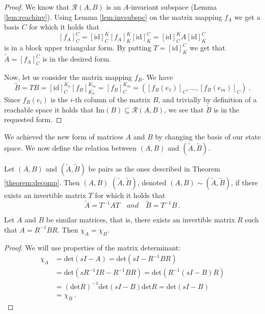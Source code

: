 \begin{proof}
	We know that $\mathcal{R}(A,B)$ is an $A$-invariant subspace (Lemma \ref{lem:reachinv}). Using Lemma \ref{lem:invsubspc} on the matrix mapping $f_A$ we get a basis $C$ for which it holds that 
	$$[f_A]^C_C=[\text{id}]^K_C[f_A]^K_K[\text{id}]^C_K=[\text{id}]^K_CA[\text{id}]^C_K$$ 
	is in a block upper triangular form. By putting $T=[\text{id}]^C_K$ we get that $\widetilde{A}=[f_A]^C_C$ is in the desired form.

	Now, let us consider the matrix mapping $f_B$. We have
	$$\widetilde{B}=TB=[\text{id}]^{K_n}_C[f_B]^{K_m}_{K_n}=[f_B]^{K_m}_C=([f_B(e_1)]_C,\ldots,[f_B(e_m)]_C)\ .$$
	Since $f_B(e_i)$ is the $i$-th column of the matrix $B$, and trivially by definition of a reachable space it holds that $\text{Im}(B)\subseteq \mathcal{R}(A,B)$, we see that $\widetilde{B}$ is in the requested form.
\end{proof}

We achieved the new form of matrices $A$ and $B$ by changing the basis of our state space. We now define the relation between $(A,B)$ and $(\widetilde{A},\widetilde{B}).$

\begin{definition}
	Let $(A,B)$ and $(\widetilde{A},\widetilde{B})$ be pairs as the ones described in Theorem \ref{theorem:decomp}. Then $(A,B)$  $(\widetilde{A},\widetilde{B})$, denoted $(A,B) \sim (\widetilde{A},\widetilde{B})$, if there exists an invertible matrix $T$ for which it holds that
	$$\widetilde{A}=T^{-1}AT\quad and\quad\widetilde{B}=T^{-1}B\ .$$
\end{definition}

\begin{lemma}
	\label{lem:simMatrices}
	Let $A$ and $B$ be similar matrices, that is, there exists an invertible matrix $R$ such that $A=R^{-1}BR$. Then $\chi_A=\chi_B$.
\end{lemma}

\begin{proof}
	We will use properties of the matrix determinant:
	\begin{align*}
		\chi_A&=\text{det}(sI-A)=\text{det}(sI-R^{-1}BR) \\
		&=\text{det}(sR^{-1}IR-R^{-1}BR)=\text{det}(R^{-1}(sI-B)R) \\
		&=(\text{det}R)^{-1}\text{det}(sI-B)\text{det}R=\text{det}(sI-B) \\
		&=\chi_B\ .
	\end{align*}
\end{proof}

